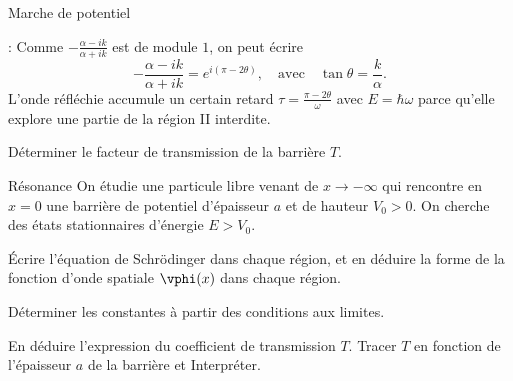 \begin{exo}[PC][2][colle]{Marche de potentiel}
\begin{quest}
{   : Comme $-\frac{\alpha-ik }{\alpha+ik}$ est de module $1$, on peut écrire
  $$
  -\frac{\alpha-ik }{\alpha+ik} = e^{i(\pi-2\theta)}, \quad \text{avec}\quad \tan \theta = \frac{k}{\alpha}.
  $$
  L'onde réfléchie accumule un certain retard $\tau = \frac{\pi-2\theta}{\omega}$ avec $E=\hbar \omega$ parce qu'elle explore une partie de la région II interdite.
  }
  \item Déterminer le facteur de transmission de la barrière $T$.
\end{quest}
\end{exo}


\begin{exo}[PC][1][colle]{Résonance}
  On étudie une particule libre venant de $x\to-\infty$ qui rencontre en $x=0$ une barrière de potentiel d'épaisseur $a$ et de hauteur $V_0>0$. On cherche des états stationnaires d’énergie $E>V_0$.

\begin{quest}
  \item  Écrire l’équation de Schrödinger dans chaque région, et en déduire la forme de la fonction d’onde spatiale $\vphi(x)$ dans chaque région.
  \item Déterminer les constantes à partir des conditions aux limites.
  \item En déduire l’expression du coefficient de  transmission $T$. Tracer $T$ en fonction de l’épaisseur $a$ de la barrière et Interpréter.
\end{quest}
\end{exo}

